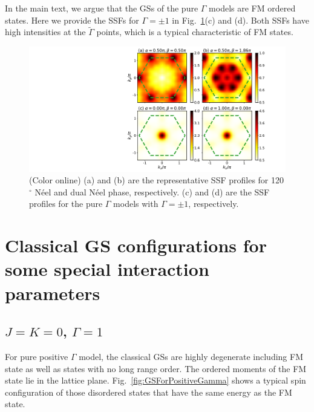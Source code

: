 \documentclass[aps,prb,reprint,amsfonts,amsmath,amssymb,showpacs,groupedaddress,superscriptaddress]{revtex4-1}
\begin{document}
In the main text, we argue that the GSs of the pure $\Gamma$ models are FM ordered states. Here we provide the SSFs for $\Gamma = \pm 1$ in Fig.~\ref{fig:AppendixSSF}(c) and (d). Both SSFs have high intensities at the $\tilde{\Gamma}$ points, which is a typical characteristic of FM states.

\begin{figure}
    \centering
    \includegraphics[width=\columnwidth]{fig/AppendixSSF.pdf}
    \caption{\label{fig:AppendixSSF}(Color online) (a) and (b) are the representative SSF profiles for 120$^\circ$ N\'{e}el and dual N\'{e}el phase, respectively. (c) and (d) are the SSF profiles for the pure $\Gamma$ models with $\Gamma = \pm 1$, respectively.}
\end{figure}

\section{\label{apx:DegeneratedStates}Classical GS configurations for some special interaction parameters}

\subsection{$J=K=0$, $\Gamma=1$}

For pure positive $\Gamma$ model, the classical GSs are highly degenerate including FM state as well as states with no long range order. The ordered moments of the FM state lie in the lattice plane. Fig.~\ref{fig:GSForPositiveGamma} shows a typical spin configuration of those disordered states that have the same energy as the FM state.
\end{document}
